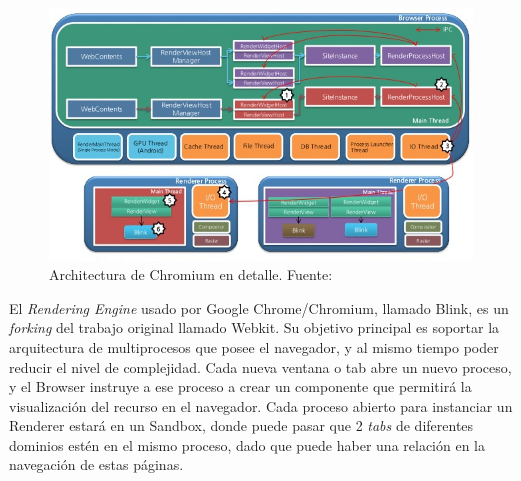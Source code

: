     \begin{figure}[h!t]
        \centering
        \includegraphics[scale=0.65]{figures/chromium-rendering-pipeline-28-638.jpg}
        \caption{Architectura de Chromium en detalle. Fuente: \cite{ChrRenderPipe}}
        \label{fig:archGC2}
    \end{figure}

    El \textit{Rendering Engine} usado por Google Chrome/Chromium, llamado Blink, es un \textit{forking} del trabajo original llamado Webkit. Su objetivo principal es soportar la arquitectura de multiprocesos que posee el navegador, y al mismo tiempo poder reducir el nivel de complejidad. Cada nueva ventana o tab abre un nuevo proceso, y el Browser instruye a ese proceso a crear un componente que permitirá la visualización del recurso en el navegador. Cada proceso abierto para instanciar un Renderer estará en un Sandbox, donde puede pasar que 2 \textit{tabs} de diferentes dominios estén en el mismo proceso, dado que puede haber una relación en la navegación de estas páginas.




